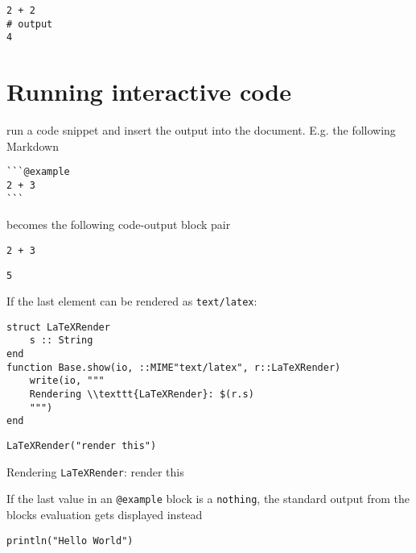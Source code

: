 \begin{verbatim}
2 + 2
# output
4
\end{verbatim}



\section{Running interactive code}



\label{3545462789522369084}{}


 run a code snippet and insert the output into the document. E.g. the following Markdown




\begin{lstlisting}
```@example
2 + 3
```
\end{lstlisting}



becomes the following code-output block pair




\begin{verbatim}
2 + 3
\end{verbatim}


\begin{lstlisting}
5
\end{lstlisting}



If the last element can be rendered as \texttt{text/latex}:




\begin{verbatim}
struct LaTeXRender
    s :: String
end
function Base.show(io, ::MIME"text/latex", r::LaTeXRender)
    write(io, """
    Rendering \\texttt{LaTeXRender}: $(r.s)
    """)
end
\end{verbatim}




\begin{verbatim}
LaTeXRender("render this")
\end{verbatim}

Rendering \texttt{LaTeXRender}: render this


If the last value in an \texttt{@example} block is a \texttt{nothing}, the standard output from the blocks{\textquotesingle} evaluation gets displayed instead




\begin{verbatim}
println("Hello World")
\end{verbatim}



